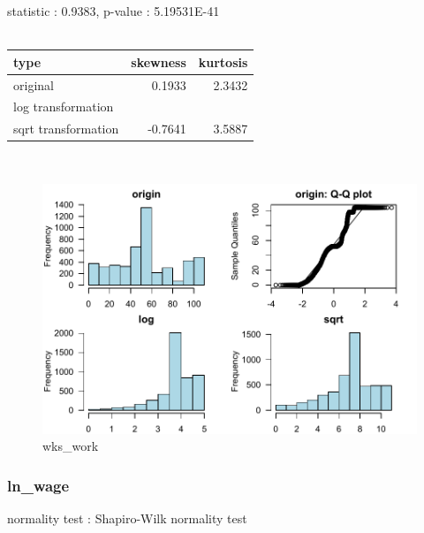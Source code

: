 \documentclass{book}\usepackage[]{graphicx}\usepackage[]{color}
\begin{document}
\noindent statistic : 0.9383,  p-value : 5.19531E-41\\
\\%
\begin{tabular}{lrr}
  \toprule
type & skewness & kurtosis \\ 
  \midrule
original & 0.1933 & 2.3432 \\ 
  log transformation &  &  \\ 
  sqrt transformation & -0.7641 & 3.5887 \\ 
   \bottomrule
\end{tabular}
\\
\begin{figure}[!ht]
\centering
\includegraphics[width=1.0\textwidth]{figure/norm20.pdf}
\caption{wks\_work}
\end{figure}
\clearpage
\subsubsection{ ln\_wage }

normality test : Shapiro-Wilk normality test
\end{document}

